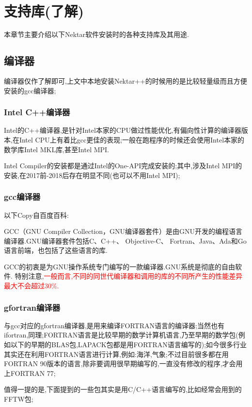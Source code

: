 \chapter{支持库(了解)}\label{surportoo}
本章节主要介绍以下Nektar软件安装时的各种支持库及其用途.\par


\section{编译器}
编译器仅作了解即可,上文中本地安装Nektar++的时候用的是比较轻量级而且方便安装的gcc编译器;
\subsection{Intel C++编译器}
Intel的C++编译器,是针对Intel本家的CPU做过性能优化,有偏向性计算的编译器版本,在Intel CPU上有着比gcc更佳的表现;一般在跑程序的时候还会使用Intel本家的数学库Intel MKL库,甚至Intel MPI.\par
Intel Compiler的安装都是通过Intel的One-API完成安装的;其中,涉及Intel MPI的安装,在2017前-2018后存在明显不同(也可以不用Intel MPI);


\subsection{gcc编译器}
以下Copy自百度百科:\par
GCC（GNU Compiler Collection，GNU编译器套件）是由GNU开发的编程语言编译器.GNU编译器套件包括C、C++、 Objective-C、 Fortran、Java、Ada和Go语言前端，也包括了这些语言的库.\par
GCC的初衷是为GNU操作系统专门编写的一款编译器.GNU系统是彻底的自由软件.
特别注意,\textcolor{red}{一般而言,不同的同世代编译器和调用的库的不同所产生的性能差异最大不会超过30\%.}


\subsection{gfortran编译器}
与gcc对应的gfortran编译器,是用来编译FORTRAN语言的编译器;当然也有ifortran,同理;FORTRAN语言是比较早期的数学计算机语言,乃至早期的数学包(例如以下的早期的BLAS包,LAPACK包都是用FORTRAN语言编写的);如今很多行业其实还在利用FORTRAN语言进行计算,例如:海洋,气象;不过目前很多都在用FORTRAN 90版本的语言,除非要调用很早期编写的,一直没有修改的程序,才会用上FORTRAN 77;\par
值得一提的是,下面提到的一些包其实是用C/C++语言编写的,比如经常会用到的FFTW包;\par


